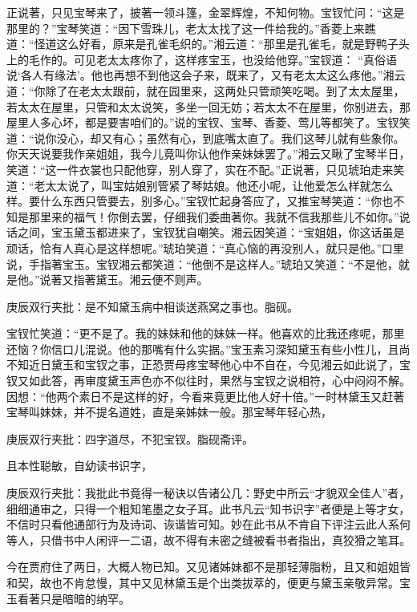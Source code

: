 \begin{parag}
    正说著，只见宝琴来了，披著一领斗篷，金翠辉煌，不知何物。宝钗忙问：“这是那里的？”宝琴笑道：“因下雪珠儿，老太太找了这一件给我的。”香菱上来瞧道：“怪道这么好看，原来是孔雀毛织的。”湘云道：“那里是孔雀毛，就是野鸭子头上的毛作的。可见老太太疼你了，这样疼宝玉，也没给他穿。”宝钗道： “真俗语说‘各人有缘法’。他也再想不到他这会子来，既来了，又有老太太这么疼他。”湘云道：“你除了在老太太跟前，就在园里来，这两处只管顽笑吃喝。到了太太屋里，若太太在屋里，只管和太太说笑，多坐一回无妨；若太太不在屋里，你别进去，那屋里人多心坏，都是要害咱们的。”说的宝钗、宝琴、香菱、莺儿等都笑了。宝钗笑道：“说你没心，却又有心；虽然有心，到底嘴太直了。我们这琴儿就有些象你。你天天说要我作亲姐姐，我今儿竟叫你认他作亲妹妹罢了。”湘云又瞅了宝琴半日，笑道：“这一件衣裳也只配他穿，别人穿了，实在不配。”正说著，只见琥珀走来笑道：“老太太说了，叫宝姑娘别管紧了琴姑娘。他还小呢，让他爱怎么样就怎么样。要什么东西只管要去，别多心。”宝钗忙起身答应了，又推宝琴笑道：“你也不知是那里来的福气！你倒去罢，仔细我们委曲著你。我就不信我那些儿不如你。”说话之间，宝玉黛玉都进来了，宝钗犹自嘲笑。湘云因笑道：“宝姐姐，你这话虽是顽话，恰有人真心是这样想呢。”琥珀笑道：“真心恼的再没别人，就只是他。”口里说，手指著宝玉。宝钗湘云都笑道：“他倒不是这样人。”琥珀又笑道：“不是他，就是他。”说著又指著黛玉。湘云便不则声。\begin{note}庚辰双行夹批：是不知黛玉病中相谈送燕窝之事也。脂砚。\end{note}宝钗忙笑道：“更不是了。我的妹妹和他的妹妹一样。他喜欢的比我还疼呢，那里还恼？你信口儿混说。他的那嘴有什么实据。”宝玉素习深知黛玉有些小性儿，且尚不知近日黛玉和宝钗之事，正恐贾母疼宝琴他心中不自在，今见湘云如此说了，宝钗又如此答，再审度黛玉声色亦不似往时，果然与宝钗之说相符，心中闷闷不解。因想：“他两个素日不是这样的好，今看来竟更比他人好十倍。”一时林黛玉又赶著宝琴叫妹妹，并不提名道姓，直是亲姊妹一般。那宝琴年轻心热，\begin{note}庚辰双行夹批：四字道尽，不犯宝钗。脂砚斋评。\end{note}且本性聪敏，自幼读书识字，\begin{note}庚辰双行夹批：我批此书竟得一秘诀以告诸公几：野史中所云“才貌双全佳人”者，细细通审之，只得一个粗知笔墨之女子耳。此书凡云“知书识字”者便是上等才女，不信时只看他通部行为及诗词、诙谐皆可知。妙在此书从不肯自下评注云此人系何等人，只借书中人闲评一二语，故不得有未密之缝被看书者指出，真狡猾之笔耳。\end{note}今在贾府住了两日，大概人物已知。又见诸姊妹都不是那轻薄脂粉，且又和姐姐皆和契，故也不肯怠慢，其中又见林黛玉是个出类拔萃的，便更与黛玉亲敬异常。宝玉看著只是暗暗的纳罕。
\end{parag}


